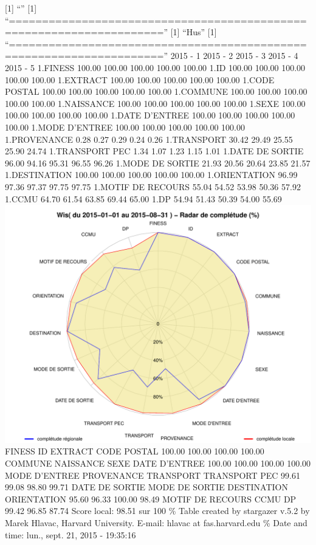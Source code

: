 \documentclass[]{article}
\begin{document}
{[}1{]} ``'' {[}1{]}
``=====================================================================''
{[}1{]} ``Hus'' {[}1{]}
``=====================================================================''
2015 - 1 2015 - 2 2015 - 3 2015 - 4 2015 - 5 1.FINESS 100.00 100.00
100.00 100.00 100.00 1.ID 100.00 100.00 100.00 100.00 100.00 1.EXTRACT
100.00 100.00 100.00 100.00 100.00 1.CODE POSTAL 100.00 100.00 100.00
100.00 100.00 1.COMMUNE 100.00 100.00 100.00 100.00 100.00 1.NAISSANCE
100.00 100.00 100.00 100.00 100.00 1.SEXE 100.00 100.00 100.00 100.00
100.00 1.DATE D'ENTREE 100.00 100.00 100.00 100.00 100.00 1.MODE
D'ENTREE 100.00 100.00 100.00 100.00 100.00 1.PROVENANCE 0.28 0.27 0.29
0.24 0.26 1.TRANSPORT 30.42 29.49 25.55 25.90 24.74 1.TRANSPORT PEC 1.34
1.07 1.23 1.15 1.01 1.DATE DE SORTIE 96.00 94.16 95.31 96.55 96.26
1.MODE DE SORTIE 21.93 20.56 20.64 23.85 21.57 1.DESTINATION 100.00
100.00 100.00 100.00 100.00 1.ORIENTATION 96.99 97.36 97.37 97.75 97.75
1.MOTIF DE RECOURS 55.04 54.52 53.98 50.36 57.92 1.CCMU 64.70 61.54
63.85 69.44 65.00 1.DP 54.94 51.43 50.39 54.00 55.69
\includegraphics{completude_files/figure-latex/finess-10.pdf} FINESS ID
EXTRACT CODE POSTAL 100.00 100.00 100.00 100.00 COMMUNE NAISSANCE SEXE
DATE D'ENTREE 100.00 100.00 100.00 100.00 MODE D'ENTREE PROVENANCE
TRANSPORT TRANSPORT PEC 99.61 99.08 98.80 99.71 DATE DE SORTIE MODE DE
SORTIE DESTINATION ORIENTATION 95.60 96.33 100.00 98.49 MOTIF DE RECOURS
CCMU DP 99.42 96.85 87.74 Score local: 98.51 sur 100 \% Table created by
stargazer v.5.2 by Marek Hlavac, Harvard University. E-mail: hlavac at
fas.harvard.edu \% Date and time: lun., sept. 21, 2015 - 19:35:16
\end{document}
